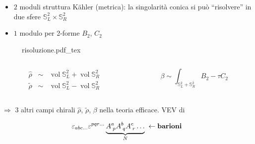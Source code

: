 \documentclass[aspectratio=43,mathserif]{beamer}
\newcommand{\ess}{\mathbb{S}}
\newcommand{\hatt}[1]{\ensuremath{\widehat{#1}}}
\newcommand{\tildd}[1]{\ensuremath{\widetilde{#1}}}
\newcommand{\vol}{\ensuremath{\operatorname{vol}}}
\begin{document}
\begin{frame}
	\begin{itemize}
		\item	$2$ moduli struttura K\"ahler (metrica): la singolarità conica si può ``risolvere'' in due sfere $\ess^2_L \times \ess^2_R$\\
			\vfill
		\item	$1$ modulo per 2-forme $B_2$, $C_2$
	\end{itemize}
	\vspace{-15pt}

	\begin{figure}[h!]\centering
		\def\svgscale{0.5}
		{risoluzione.pdf_tex}
	\end{figure}

	\vspace{-35pt}

	\begin{columns}
		\begin{column}{0.5\textwidth}

			\begin{align}
				\hatt\rho \;\; \sim\;\;  \vol \ess^2_L + \vol \ess^2_R\\
				\tildd\rho \;\; \sim\;\;  \vol \ess^2_L - \vol \ess^2_R
			\end{align}
		\end{column}
		\begin{column}{0.5\textwidth}
			\vfill
			\vspace{10pt}
			\begin{equation}
				\beta \sim \int_{\ess_L^2 + \ess_R^2} B_2 - \tau C_2
				\label{}
			\end{equation}
		\end{column}
	\end{columns}

	\vfill
	\vspace{15pt}

	$\Longrightarrow$ $3$ altri campi chirali {\Large $\hatt\rho$, $\tildd\rho$, $\beta$} nella teoria efficace. VEV di

	\begin{equation}
		\varepsilon_{abc\ldots} \varepsilon^{pqr\ldots} \underbrace{A^a_{\;p} A^b_{\;q} A^c_{\;r} \ldots}_{N}\; \leftarrow \text{\textbf{barioni}}
		\label{}
	\end{equation}

\end{frame}
\end{document}
